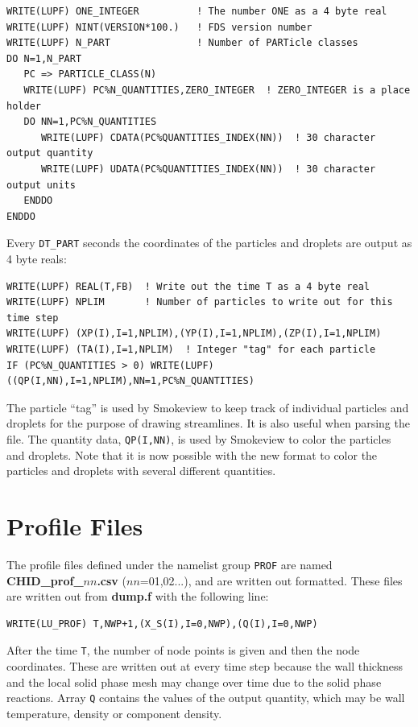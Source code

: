 \documentclass[11pt]{book}
\newcommand{\ct}{\tt\small}
\begin{document}
\footnotesize
\begin{verbatim}
WRITE(LUPF) ONE_INTEGER          ! The number ONE as a 4 byte real
WRITE(LUPF) NINT(VERSION*100.)   ! FDS version number
WRITE(LUPF) N_PART               ! Number of PARTicle classes
DO N=1,N_PART
   PC => PARTICLE_CLASS(N)
   WRITE(LUPF) PC%N_QUANTITIES,ZERO_INTEGER  ! ZERO_INTEGER is a place holder
   DO NN=1,PC%N_QUANTITIES
      WRITE(LUPF) CDATA(PC%QUANTITIES_INDEX(NN))  ! 30 character output quantity
      WRITE(LUPF) UDATA(PC%QUANTITIES_INDEX(NN))  ! 30 character output units
   ENDDO
ENDDO
\end{verbatim}
\normalsize
Every {\ct DT\_PART} seconds the coordinates of the particles and droplets are output as 4 byte reals:

\footnotesize
\begin{verbatim}
WRITE(LUPF) REAL(T,FB)  ! Write out the time T as a 4 byte real
WRITE(LUPF) NPLIM       ! Number of particles to write out for this time step
WRITE(LUPF) (XP(I),I=1,NPLIM),(YP(I),I=1,NPLIM),(ZP(I),I=1,NPLIM)
WRITE(LUPF) (TA(I),I=1,NPLIM)  ! Integer "tag" for each particle
IF (PC%N_QUANTITIES > 0) WRITE(LUPF) ((QP(I,NN),I=1,NPLIM),NN=1,PC%N_QUANTITIES)
\end{verbatim}
\normalsize
The particle ``tag'' is used by Smokeview to keep track of individual particles and droplets for the purpose of drawing
streamlines. It is also useful when parsing the file. The quantity data, {\ct QP(I,NN)}, is used by Smokeview to color
the particles and droplets. Note that it is now possible with the new format to color the particles and droplets with
several different quantities.

\section{Profile Files}%
\label{out:PROF}

The profile files defined under the namelist group {\ct PROF} are
named {\bf CHID\_prof\_$nn$.csv} ($nn$=01,02...),
and are written out formatted. These files are written out from {\bf
dump.f} with the following line:

\footnotesize
\begin{verbatim}
WRITE(LU_PROF) T,NWP+1,(X_S(I),I=0,NWP),(Q(I),I=0,NWP)
\end{verbatim}
\normalsize
After the time {\ct T}, the number of node points is given and then
the node coordinates. These are written out at every time step because
the wall thickness and the local solid phase mesh may change over time
due to the solid phase reactions. Array {\ct Q} contains the values of
the output quantity, which may be wall temperature, density or
component density.


%



\printindex
\end{document}
